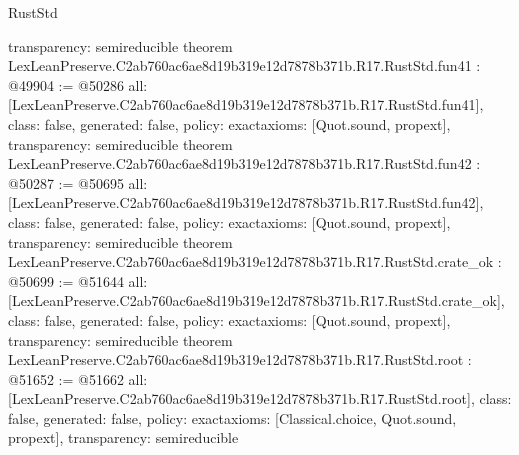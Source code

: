 \begin{lexlean}{RustStd}
\begin{coremodule}
{  transparency: semireducible
}
theorem LexLeanPreserve.C2ab760ac6ae8d19b319e12d7878b371b.R17.RustStd.fun41 : @49904 := @50286 {
  all: [LexLeanPreserve.C2ab760ac6ae8d19b319e12d7878b371b.R17.RustStd.fun41],
  class: false,
  generated: false,
  policy: exact{axioms: [Quot.sound, propext]},
  transparency: semireducible
}
theorem LexLeanPreserve.C2ab760ac6ae8d19b319e12d7878b371b.R17.RustStd.fun42 : @50287 := @50695 {
  all: [LexLeanPreserve.C2ab760ac6ae8d19b319e12d7878b371b.R17.RustStd.fun42],
  class: false,
  generated: false,
  policy: exact{axioms: [Quot.sound, propext]},
  transparency: semireducible
}
theorem LexLeanPreserve.C2ab760ac6ae8d19b319e12d7878b371b.R17.RustStd.crate_ok : @50699 := @51644 {
  all: [LexLeanPreserve.C2ab760ac6ae8d19b319e12d7878b371b.R17.RustStd.crate_ok],
  class: false,
  generated: false,
  policy: exact{axioms: [Quot.sound, propext]},
  transparency: semireducible
}
theorem LexLeanPreserve.C2ab760ac6ae8d19b319e12d7878b371b.R17.RustStd.root : @51652 := @51662 {
  all: [LexLeanPreserve.C2ab760ac6ae8d19b319e12d7878b371b.R17.RustStd.root],
  class: false,
  generated: false,
  policy: exact{axioms: [Classical.choice, Quot.sound, propext]},
  transparency: semireducible
}


\end{coremodule}
\end{lexlean}
